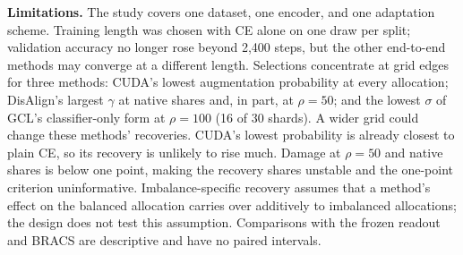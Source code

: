 \textbf{Limitations.} The study covers one dataset, one encoder, and one adaptation scheme. Training length was chosen with CE alone on one draw per split; validation accuracy no longer rose beyond 2,400 steps, but the other end-to-end methods may converge at a different length. Selections concentrate at grid edges for three methods: CUDA's lowest augmentation probability at every allocation; DisAlign's largest $\gamma$ at native shares and, in part, at $\rho=50$; and the lowest $\sigma$ of GCL's classifier-only form at $\rho=100$ (16 of 30 shards). A wider grid could change these methods' recoveries. CUDA's lowest probability is already closest to plain CE, so its recovery is unlikely to rise much. Damage at $\rho=50$ and native shares is below one point, making the recovery shares unstable and the one-point criterion uninformative. Imbalance-specific recovery assumes that a method's effect on the balanced allocation carries over additively to imbalanced allocations; the design does not test this assumption. Comparisons with the frozen readout and BRACS are descriptive and have no paired intervals.
